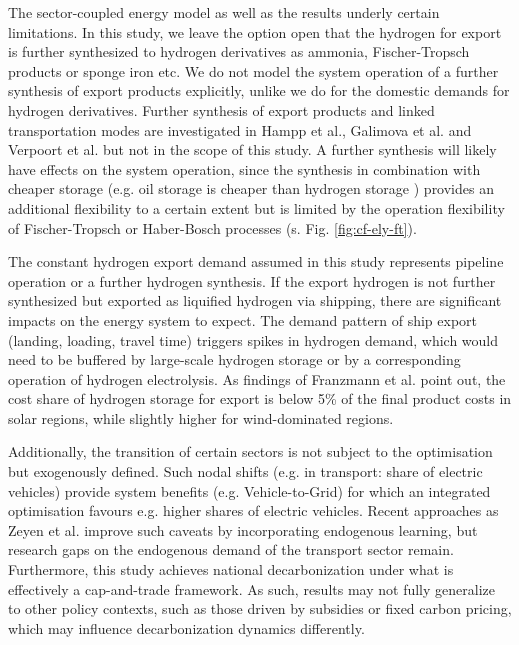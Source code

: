 \documentclass[5p,numafflabel]{elsarticle}
\begin{document}

The sector-coupled energy model as well as the results underly certain limitations. In this study, we leave the option open that the hydrogen for export is further synthesized to hydrogen derivatives as ammonia, Fischer-Tropsch products or sponge iron etc. We do not model the system operation of a further synthesis of export products explicitly, unlike we do for the domestic demands for hydrogen derivatives. Further synthesis of export products and linked transportation modes are investigated in Hampp et al.\cite{Hampp2023}, Galimova et al.\cite{Galimova2023} and Verpoort et al.\cite{Verpoort2023} but not in the scope of this study.
A further synthesis will likely have effects on the system operation, since the synthesis in combination with cheaper storage (e.g. oil storage is cheaper than hydrogen storage \cite{DEA2019TechnologyData}) provides an additional flexibility to a certain extent but is limited by the operation flexibility of Fischer-Tropsch or Haber-Bosch processes (s. Fig. \ref{fig:cf-ely-ft}).

The constant hydrogen export demand assumed in this study represents pipeline operation or a further hydrogen synthesis.
If the export hydrogen is not further synthesized but exported as liquified hydrogen via shipping, there are significant impacts on the energy system to expect. The demand pattern of ship export (landing, loading, travel time) triggers spikes in hydrogen demand, which would need to be buffered by large-scale hydrogen storage or by a corresponding operation of hydrogen electrolysis. As findings of Franzmann et al. \cite{Franzmann2023} point out, the cost share of hydrogen storage for export is below 5\% of the final product costs in solar regions, while slightly higher for wind-dominated regions.

Additionally, the transition of certain sectors is not subject to the optimisation but exogenously defined. Such nodal shifts (e.g. in transport: share of electric vehicles) provide system benefits (e.g. Vehicle-to-Grid) for which an integrated optimisation favours e.g. higher shares of electric vehicles.
Recent approaches as Zeyen et al.\cite{Zeyen2023} improve such caveats by incorporating endogenous learning, but research gaps on the endogenous demand of the transport sector remain.
Furthermore, this study achieves national decarbonization under what is effectively a cap-and-trade framework. As such, results may not fully generalize to other policy contexts, such as those driven by subsidies or fixed carbon pricing, which may influence decarbonization dynamics differently.
\end{document}
